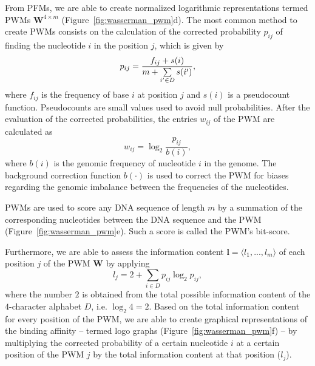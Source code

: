 From PFMs, we are able to create normalized logarithmic representations termed PWMs $\mathbf{W}^{4 \times m}$ (Figure~\ref{fig:wasserman_pwm}d). The most common method to create PWMs consists on the calculation of the corrected probability $ p_{ij} $ of finding the nucleotide $ i $ in the position $ j $, which is given by
\begin{equation}
  \label{eq:pwm1}
  p_{ij} = \frac{ f_{ij} + s(i) }{ m + {\sum\limits _{i^\prime \in D}{ \hspace{-0.0cm} s(i^\prime)}} }, 
\end{equation}
where $ f_{ij} $ is the frequency of base $ i $ at position $ j $ and $ s(i) $ is a pseudocount function. Pseudocounts are small values used to avoid null probabilities. After the evaluation of the corrected probabilities, the entries $ w_{ij} $ of the PWM are calculated as
\begin{equation}
  \label{eq:pwm2}
  w_{ij} = \log_2 \frac{ p_{ij} }{ b(i) }, 
\end{equation}
where $ b(i) $ is the genomic frequency of nucleotide $ i $ in the genome. The background correction function $b(\cdot)$ is used to correct the PWM for biases regarding the genomic imbalance between the frequencies of the nucleotides.

PWMs are used to score any DNA sequence of length $m$ by a summation of the corresponding nucleotides between the DNA sequence and the PWM (Figure~\ref{fig:wasserman_pwm}e). Such a score is called the PWM's bit-score.

Furthermore, we are able to assess the information content $ \mathbf{l} = \langle{l}_{1}, ..., {l}_{m}\rangle $ of each position $ j $ of the PWM $ \mathbf{W} $ by applying
\begin{equation}
  \label{eq:pwm.ic}
  {l}_{j} = 2 + \sum\limits _{i \in D} p_{ij} \log_{2} p_{ij},
\end{equation}
where the number $2$ is obtained from the total possible information content of the $4$-character alphabet $D$, i.e. $\log_{2}4 = 2$. Based on the total information content for every position of the PWM, we are able to create graphical representations of the binding affinity -- termed logo graphs (Figure~\ref{fig:wasserman_pwm}f) -- by multiplying the corrected probability of a certain nucleotide $i$ at a certain position of the PWM $j$ by the total information content at that position (${l}_{j}$).


